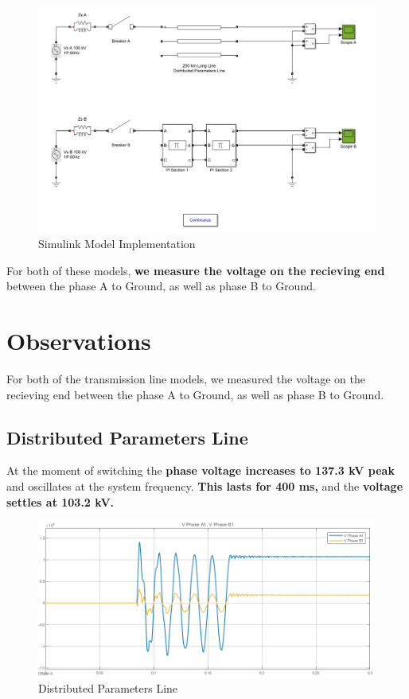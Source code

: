 \documentclass[12pt]{article}
\begin{document}
  \begin{figure}[H]
    \centering
    \includegraphics[width=6in]{img/model.png}
    \caption{Simulink Model Implementation}
    \label{Model}
  \end{figure}

  For both of these models, {\bf we measure the voltage on the recieving end} 
  between the phase A to Ground, as well as phase B to Ground.

  \pagebreak
  \section{Observations}
  For both of the transmission line models, we measured the voltage on the 
  recieving end between the phase A to Ground, as well as phase B to Ground.

    \subsection{Distributed Parameters Line}
    At the moment of switching the {\bf phase voltage increases to 137.3 kV peak} and
    oscillates at the system frequency. {\bf This lasts for 400 ms,} and
    the {\bf voltage settles at 103.2 kV.}
    \begin{figure}[H]
      \centering
      \includegraphics[width=5in]{img/scope_a.png}
      \caption{Distributed Parameters Line}
      \label{scope_a}
    \end{figure}
\end{document}
